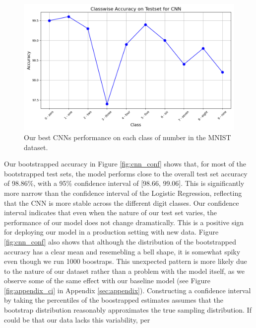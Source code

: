 \begin{figure}[H]
    \centering
    \includegraphics[width=\linewidth]{results/evaluation/CNN_classwise_acc.png}
    \caption{Our best CNNs performance on each class of number in the MNIST dataset.}
    \label{fig:ClasswiseAccuracyCNN}
\end{figure}

\newpage
Our bootstrapped accuracy in Figure \ref{fig:cnn_conf} shows that, for most of the bootstrapped test sets, the model performs close to the overall test set accuracy of 98.86\%, with a 95\% confidence interval of [98.66, 99.06]. This is significantly more narrow than the confidence interval of the Logistic Regression, reflecting that the CNN is more stable across the different digit classes. Our confidence interval indicates that even when the nature of our test set varies, the performance of our model does not change dramatically. This is a positive sign for deploying our model in a production setting with new data. 
Figure \ref{fig:cnn_conf} also shows that although the distribution of the bootstrapped accuracy has a clear mean and resemebling a bell shape, it is somewhat spiky even though we run 1000 boostraps. This unexpected pattern is more likely due to the nature of our dataset rather than a problem with the model itself, as we observe some of the same effect with our baseline model (see Figure \ref{fig:appendix_ci} in Appendix \ref{sec:appendix}). Constructing a confidence interval by taking the percentiles of the boostrapped estimates assumes that the bootstrap distribution reasonably approximates the true sampling distribution. If could be that our data lacks this variability, per
\newline
\newline

